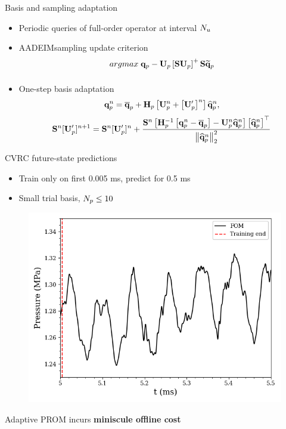 \documentclass[]{beamer}
\begin{document}
\begin{frame}{Basis and sampling adaptation}
	\begin{itemize}
		\item Periodic queries of full-order operator at interval $N_u$
		\item AADEIM\footnotemark[15] sampling update criterion
		\begin{equation*}
			\argmax{} \primVec - \primTrial \left[\sampMat \primTrial\right]^+ \sampMat \primVecRom
		\end{equation*}
		\item One-step basis adaptation\footnotemark[16]
		\begin{equation*}
			\primVec^{\timeIdx} = \primVecCent + \primScale \left[\primTrial^{\timeIdx} + \left[\primTrialUpdate\right]^{\timeIdx} \right] \primVecCoef^{\timeIdx},
		\end{equation*}
		\begin{equation*}
			\sampMat^{\timeIdx} [\primTrialUpdate]^{\timeIdx+1} = \sampMat^{\timeIdx} [\primTrialUpdate]^{\timeIdx} + \frac{\sampMat^{\timeIdx} \left[\primScaleInv\left[\primVec^{\timeIdx} - \primVecCent\right] - \primTrial^{\timeIdx} \primVecCoef^{\timeIdx}\right]\left[\primVecCoef^{\timeIdx}\right]^\top}{\left\Vert \primVecCoef^{\timeIdx} \right\Vert^2_2}
		\end{equation*}
	\end{itemize}

\end{frame}

\begin{frame}{CVRC future-state predictions}
	\begin{itemize}
		\item Train only on first 0.005 ms, predict for 0.5 ms
		\item Small trial basis, $N_p \le 10$ 
	\end{itemize}
	\begin{figure}
			\includegraphics[width=0.5\linewidth]{Images/experiments/cvrc/press_fom_train_bound.png}
	\end{figure}
	\begin{tcolorbox}[colframe=blue!50!white,halign=center]
		Adaptive PROM incurs \textbf{miniscule offline cost}
	\end{tcolorbox}
\end{frame}
\end{document}
